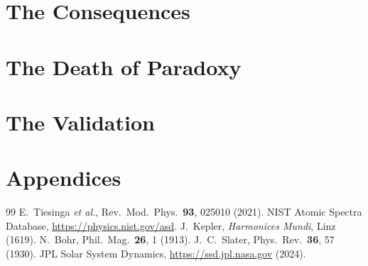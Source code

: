 \documentclass[12pt,a4paper,openright]{book}
\begin{document}





\part{The Consequences}
\label{vol:consequences}










\part{The Death of Paradoxy}
\label{vol:paradoxy}







\part{The Validation}
\label{vol:validation}






\appendix
\part*{Appendices}







\begin{thebibliography}{99}
 E.~Tiesinga \emph{et al.}, Rev.\ Mod.\ Phys.\ \textbf{93}, 025010 (2021).
 NIST Atomic Spectra Database, \url{https://physics.nist.gov/asd}.
 J.~Kepler, \emph{Harmonices Mundi}, Linz (1619).
 N.~Bohr, Phil.\ Mag.\ \textbf{26}, 1 (1913).
 J.~C.~Slater, Phys.\ Rev.\ \textbf{36}, 57 (1930).
 JPL Solar System Dynamics, \url{https://ssd.jpl.nasa.gov} (2024).
\end{thebibliography}
\end{document}

